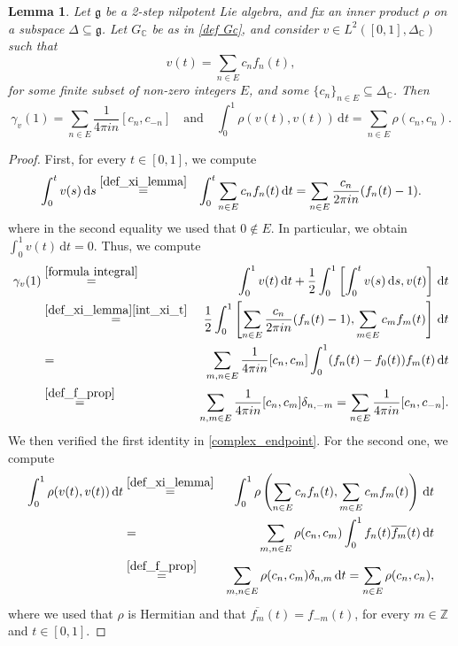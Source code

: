 \documentclass[a4paper,11pt,reqno]{amsart}
\theoremstyle{plain}
\newtheorem{lemma}[theorem]{Lemma}
\theoremstyle{definition}
\newcommand{\Z}{\mathbb Z}
\newcommand{\C}{\mathbb C}
\newcommand{\g}{\mathfrak{g}}
\newcommand{\de}{\mathrm{d}}
\begin{document}
\begin{lemma} \label{lemma lemma}
 Let $\g$ be a 2-step nilpotent Lie algebra, and fix an inner product $\rho$ on a subspace $\Delta \subseteq \g$. Let $G_\C$ be as in \eqref{def Gc}, and consider $v \in L^2([0,1],\Delta_\C)$ such that
 \begin{equation} \label{def_xi_lemma}
 v(t) = \sum_{n \in E} c_nf_n(t), 
 \end{equation}
 for some finite subset of non-zero integers $E$, and some $\{c_n\}_{n\in E} \subseteq \Delta_\C$. Then
 \begin{equation} \label{complex_endpoint_1}
 \gamma_v(1) = \sum_{n \in E} \frac{1}{4 \pi i n} [c_n,c_{-n}] \quad \text{and} \quad \int^1_0 \rho(v(t),v(t)) \, \de t
 = \sum_{n \in E} \rho(c_n,c_n).
\end{equation}
\end{lemma}

\begin{proof}
 First, for every $t \in [0,1]$, we compute
 \begin{eqnarray} \label{int_xi_t}
 \int^t_0 v(s) \, \de s &\stackrel{\eqref{def_xi_lemma}}{=}& \int^t_0 \sum_{n \in E} c_nf_n(t) \, \de t = \sum_{n \in E} \frac{c_n}{2 \pi i n}(f_n(t)-1).
 \end{eqnarray}
 where in the second equality we used that $0 \notin E$. In particular, we obtain $\int^1_0 v(t) \, \de t = 0$. Thus, we compute
 \begin{eqnarray*}
 \gamma_v(1) &\stackrel{\eqref{formula integral}}{=}& \int^1_0 v(t) \, \de t + 
 \frac{1}{2} \int^1_0 \left[\int^t_0 v(s) \, \de s, v(t) \right] \, \de t \\ &\stackrel{\eqref{def_xi_lemma}\eqref{int_xi_t}}{=}& \frac{1}{2} \int^1_0 \left[ \sum_{n \in E} \frac{c_n}{2 \pi i n}(f_n(t)-1), \sum_{m \in E} c_mf_m(t)\right] \, \de t \\
 &=& \sum_{m,n \in E} \frac{1}{4\pi i n} [c_n,c_m] \int^1_0 (f_n(t)-f_0(t))f_m(t) \, \de t \\
 &\stackrel{\eqref{def_f_prop}}{=}& \sum_{n,m \in E} \frac{1}{4\pi in} [c_n,c_{m}]\delta_{n,-m} = \sum_{n \in E} \frac{1}{4\pi in} [c_n,c_{-n}]. 
 \end{eqnarray*} 
 We then verified the first identity in \eqref{complex_endpoint}. For the second one, we compute 
 \begin{eqnarray*}
 \int^1_0 \rho(v(t),v(t)) \, \de t &\stackrel{\eqref{def_xi_lemma}}{=}& \int^1_0 \rho\left(\sum_{n \in E} c_nf_n(t),\sum_{m \in E} c_mf_m(t)\right) \, \de t \\
 &=& \sum_{m,n \in E} \rho(c_n,c_m)\int^1_0 f_n(t)\overline{f_m}(t) \, \de t \\
 &\stackrel{\eqref{def_f_prop}}{=}& \sum_{m,n \in E} \rho(c_n,c_m) \delta_{n,m} \, \de t = \sum_{n \in E} \rho(c_n,c_n),
 \end{eqnarray*}
 where we used that $\rho$ is Hermitian and that $\overline{f_m}(t)=f_{-m}(t)$, for every $m \in \Z$ and $t \in [0,1]$.
 \end{proof}
\end{document}
